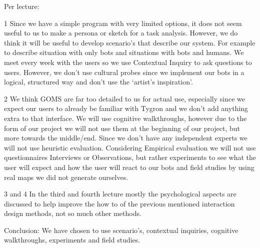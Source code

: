 Per lecture:

1
Since we have a simple program with very limited options, it does not seem useful to us to make a persona or sketch for a task analysis.
However, we do think it will be useful to develop scenario's that describe our system. For example to describe situation with only bots and situations with bots and humans.
We meet every week with the users so we use Contextual Inquiry to ask questions to users. However, we don’t use cultural probes since we implement our bots in a logical, structured way and don’t use the ‘artist’s inspiration’.

2
We think GOMS are far too detailed to us for actual use, especially since we expect our users to already be familiar with Tygron and we don’t add anything extra to that interface. 
We will use cognitive walkthroughs, however due to the form of our project we will not use them at the beginning of our project, but more towards the middle/end. 
Since we don’t have any independent experts we will not use heuristic evaluation. 
Considering Empirical evaluation we will not use questionnaires Interviews or Observations, but rather experiments to see what the user will expect and how the user will react to our bots and field studies by using real maps we did not generate ourselves.


3 and 4
In the third and fourth lecture mostly the psychological aspects are discussed to help improve the how to of the previous mentioned interaction design methods, not so much other methods.


Conclusion:
We have chosen to use scenario's, contextual inquiries, cognitive walkthroughs, experiments and field studies.